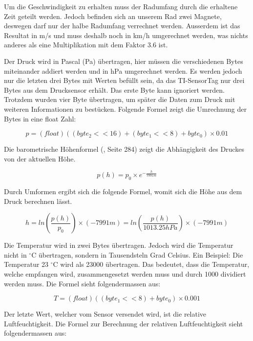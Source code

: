 Um die Geschwindigkeit zu erhalten muss der Radumfang durch die erhaltene Zeit geteilt werden. Jedoch befinden sich an unserem Rad zwei Magnete, deswegen darf nur der halbe Radumfang verrechnet werden. Ausserdem ist das Resultat in m/s und muss deshalb noch in km/h umgerechnet werden, was nichts anderes als eine Multiplikation mit dem Faktor 3.6 ist.

Der Druck wird in Pascal (Pa) übertragen, hier müssen die verschiedenen Bytes miteinander addiert werden und in hPa umgerechnet werden. Es werden jedoch nur die letzten drei Bytes mit Werten befüllt sein, da das TI-SensorTag nur drei Bytes aus dem Drucksensor erhält. Das erste Byte kann ignoriert werden. Trotzdem wurden vier Byte übertragen, um später die Daten zum Druck mit weiteren Informationen zu bestücken. Folgende Formel zeigt die Umrechnung der Bytes in eine float Zahl:

\begin{equation}
	p = (float)((byte_2 << 16) + (byte_1 << 8) + byte_0) \times 0.01
\end{equation}

Die barometrische Höhenformel (\cite{Formelbuch}, Seite 284) zeigt die Abhängigkeit des Druckes von der aktuellen Höhe.

\begin{equation}
	p(h) = p_0 \times e^{-\frac{h}{7991 m}}
\end{equation}

Durch Umformen ergibt sich die folgende Formel, womit sich die Höhe aus dem Druck berechnen lässt.

\begin{equation}
	h = ln(\frac{p(h)}{p_0}) \times (-7991 m) = ln(\frac{p(h)}{1013.25 hPa}) \times (-7991 m)
\end{equation}

Die Temperatur wird in zwei Bytes übertragen. Jedoch wird die Temperatur nicht in $^\circ$C übertragen, sondern in Tausendsteln Grad Celsius. Ein Beispiel: Die Temperatur 23 $^\circ$C wird als 23000 übertragen. Das bedeutet, dass die Temperatur, welche empfangen wird, zusammengesetzt werden muss und durch 1000 dividiert werden muss. Die Formel sieht folgendermassen aus:

\begin{equation}
	T = (float)((byte_1 << 8) + byte_0) \times 0.001
\end{equation}

Der letzte Wert, welcher vom Sensor versendet wird, ist die relative Luftfeuchtigkeit. Die Formel zur Berechnung der relativen Luftfeuchtigkeit sieht folgendermassen aus:

